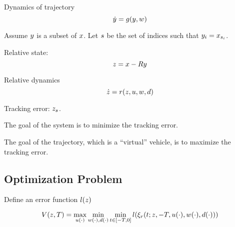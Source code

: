  Dynamics of trajectory
 \begin{equation}
 \dot{y} = g(y, w)
 \end{equation}
 
 Assume $y$ is a subset of $x$. Let $s$ be the set of indices such that $y_i = x_{s_i}$.
 
 Relative state:
 \begin{equation}
 z = x - Ry
 \end{equation}
 
 Relative dynamics
 \begin{equation}
 \dot{z} = r(z, u, w, d)
 \end{equation}
 
 Tracking error: $z_{s}$.
 
 The goal of the system is to minimize the tracking error.
 
 The goal of the trajectory, which is a ``virtual'' vehicle, is to maximize the tracking error.
 
 \subsection{Optimization Problem}
 Define an error function $l(z)$
 
 \begin{equation}
 V(z, T) = \max_{u(\cdot)} \min_{w(\cdot), d(\cdot)} \min_{t \in [-T, 0]} l(\xi_r(t; z, -T, u(\cdot), w(\cdot), d(\cdot))) 
 \end{equation}
 
